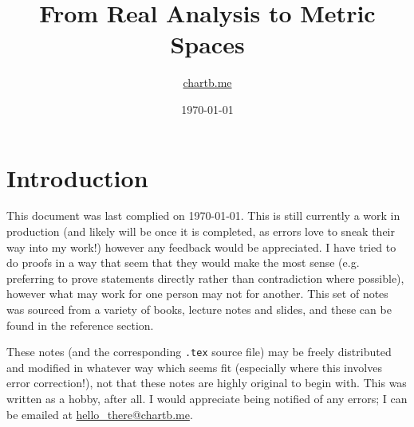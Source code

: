 \documentclass{article}
\title{From Real Analysis to Metric Spaces}
\author{\href{https://chartb.me/}{chartb.me}}
\date{\today}
\begin{document}

\begin{tcolorbox}[colback = cyan!15, colframe = purple!70]
\maketitle %
\tcblower
\tableofcontents %
\end{tcolorbox}


\newpage %

\section*{Introduction}

This document was last complied on \today. This is still currently a work in production (and likely will be once it is completed, as errors love to sneak their way into my work!) however any feedback would be appreciated. I have tried to do proofs in a way that seem that they would make the most sense (e.g. preferring to prove statements directly rather than contradiction where possible), however what may work for one person may not for another. This set of notes was sourced from a variety of books, lecture notes and slides, and these can be found in the reference section.


These notes (and the corresponding \texttt{.tex} source file) may be freely distributed and modified in whatever way which seems fit (especially where this involves error correction!), not that these notes are highly original to begin with. This was written as a hobby, after all. I would appreciate being notified of any errors; I can be emailed at \href{mailto:hello_there@chartb.me}{hello\_there@chartb.me}.






\end{document}
